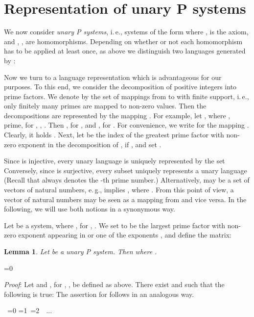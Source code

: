 \documentclass[copyright]{eptcs}
\makeatletter
\newtheorem{lemma}[theorem]{Lemma}
\newcounter{d@proof}\let\thed@proof\relax\setcounter{d@proof}{0}
\newcommand*{\qed}{}
\newenvironment{proof}{\ifnum \value{d@proof}=0{\setcounter{claim}{0}}\else\fi
  \stepcounter{d@proof}\par\noindent
  {\rmfamily\itshape\mdseries Proof\/}:\hspace{\labelsep}\ignorespaces}{\addtocounter{d@proof}{-1}\mbox{}\nolinebreak\hfill~\ifnum \value{d@proof}=0{\qed}\else
    \ifnum \value{d@proof}=1{\qed\nolinebreak\,\nolinebreak\qed}\else
      \ifnum \value{d@proof}=2{\qed\nolinebreak\,\nolinebreak\qed
          \nolinebreak\,\nolinebreak\qed}\else
        {\qed\nolinebreak...\nolinebreak\qed}\fi\fi\fi
  \medbreak
}
\makeatother
\begin{document}
\newpage

\section{Representation of unary P systems}

We now consider \textit{unary P systems}, i.\,e., systems of the form 
where ,  is the axiom, and , , are homomorphisms. Depending on whether or not each homomorphism
has to be applied at least once, as above we distinguish two languages
generated by : 


Now we turn to a language representation which is advantageous for our
purposes. To this end, we consider the decomposition of positive integers
into prime factors. We denote by  the set of mappings from 
to  with finite support, i.\,e., only finitely many primes are
mapped to non-zero values. Then the decompositions are represented by the
mapping . For example, let , where ,  prime,  for , , . Then , for , and , for 
\hbox{}. For convenience, we write  for the mapping . Clearly, it holds \hbox{}. Next, let  be the
index of the greatest prime factor with non-zero exponent in the
decomposition of , if , and set .

Since  is injective, every unary language  is uniquely represented by
the set 
Conversely, since  is
surjective, every subset  uniquely represents a unary language 
(Recall that  always denotes the -th prime number.) Alternatively, 
 may be a set of vectors of natural numbers, e.\,g.,  implies , where . From this point of view, a vector of natural numbers may be
seen as a mapping from  and vice versa. In the following, we will use both
notions in a synonymous way.

\medskip

Let  be a system, where , for , . We set\linebreak
\hbox{}
to be the largest prime factor
with non-zero exponent appearing in  or one of the exponents ,
and define the matrix: 


\medskip

\begin{lemma}
Let  be a unary P system.
Then 
where .
\end{lemma}

\begin{proof}
Let  and , for \hbox{}, , be defined as
above. There exist  and 
 such that
the following is true: 
The assertion for  follows in an analogous way.
\end{proof}
\end{document}
